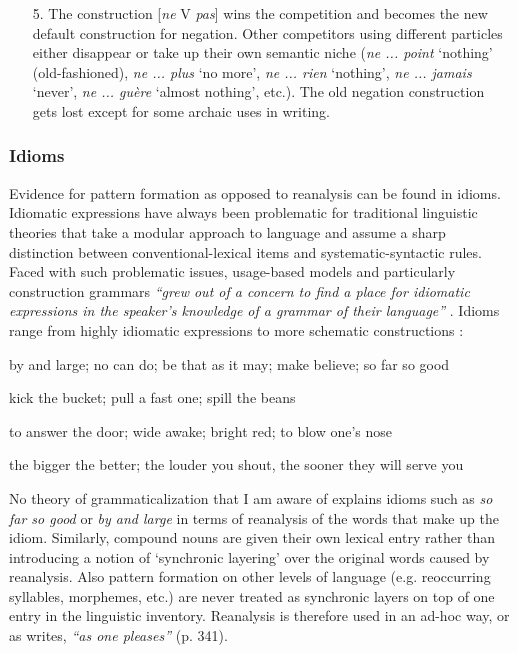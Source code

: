 \begin{enumerate}  \item[5.]  The construction [{\em ne} V {\em pas}] wins the competition and becomes the new default construction for negation. Other competitors using different particles either disappear or take up their own semantic niche ({\em ne ... point} `nothing' (old-fashioned), {\em ne ... plus} `no more', {\em ne ... rien} `nothing', {\em ne ... jamais} `never', {\em ne ... gu\`{e}re} `almost nothing', etc.). The old negation construction gets lost except for some archaic uses in writing.
\end{enumerate}

 

\subsubsection{Idioms}
 Evidence for pattern formation as opposed to reanalysis can be found in idioms. Idiomatic expressions have always been problematic for traditional linguistic theories that take a modular approach to language and assume a sharp distinction between conventional-lexical items and systematic-syntactic rules. Faced with such problematic issues, usage-based models and particularly construction grammars {\em ``grew out of a concern to find a place for idiomatic expressions in the speaker's knowledge of a grammar of their language''} \citep[225]{croft04cognitive}. Idioms range from highly idiomatic expressions to more schematic constructions \citep[][chapter 9]{croft04cognitive}:

\ea
by and large; no can do; be that as it may; make believe; so far so good
\item kick the bucket; pull a fast one; spill the beans
\item to answer the door; wide awake; bright red; to blow one's nose
\item the bigger the better; the louder you shout, the sooner they will serve you
\z

No theory of grammaticalization that I am aware of explains idioms such as {\em so far so good} or {\em by and large} in terms of reanalysis of the words that make up the idiom. Similarly, compound nouns are given their own lexical entry rather than introducing a notion of `synchronic layering' \citep[124--126]{hopper93grammaticalization} over the original words caused by reanalysis. Also pattern formation on other levels of language (e.g. reoccurring syllables, morphemes, etc.) are never treated as synchronic layers on top of one entry in the linguistic inventory. Reanalysis is therefore used in an ad-hoc way, or as \citet{haspelmath98does} writes, {\em ``as one pleases''} (p. 341).

